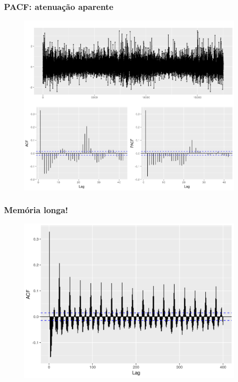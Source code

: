 \documentclass[mathserif,serif]{beamer}
\begin{document}
\begin{frame}
	\frametitle{PACF: atenuação aparente}
	\begin{figure}
		\centering
		\includegraphics[scale=0.4]{long_memory.png}
	\end{figure}
\end{frame}

\begin{frame}
	\frametitle{Memória longa!}
	\begin{figure}
		\centering
		\includegraphics[scale=0.6]{long_memory_lagmax.png}
	\end{figure}
\end{frame}
\end{document}
